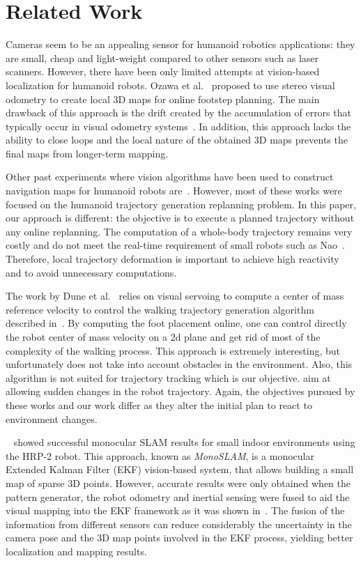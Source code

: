 \section{Related Work}\label{sec:related}

Cameras seem to be an appealing sensor for humanoid robotics
applications: they are small, cheap and light-weight compared to other
sensors such as laser scanners. However, there have been only limited
attempts at vision-based localization for humanoid robots. Ozawa et
al.~\cite{Ozawa05smc} proposed to use stereo visual odometry to create
local 3D maps for online footstep planning. The main drawback of this
approach is the drift created by the accumulation of errors that
typically occur in visual odometry
systems~\cite{Nister04cvpr,Kaess09icra}. In addition, this approach
lacks the ability to close loops and the local nature of the obtained
3D maps prevents the final maps from longer-term mapping.

Other past experiments where vision algorithms have been used to
construct navigation maps for humanoid robots
are~\cite{Michel05humanoids,Michel06icra,Chestnut10book}. However,
most of these works were focused on the humanoid trajectory generation
replanning problem. In this paper, our approach is different: the
objective is to execute a planned trajectory without any online
replanning. The computation of a whole-body trajectory remains very
costly and do not meet the real-time requirement of small robots such
as Nao~\cite{wikipedia.nao}. Therefore, local trajectory deformation
is important to achieve high reactivity and to avoid unnecessary
computations.

The work by Dune et al.~\cite{Dune10iros} relies on visual servoing to
compute a center of mass reference velocity to control the walking
trajectory generation algorithm described in~\cite{Herdt10adr}. By
computing the foot placement online, one can control directly the
robot center of mass velocity on a 2d plane and get rid of most of the
complexity of the walking process. This approach is extremely
interesting, but unfortunately does not take into account obstacles in
the environment. Also, this algorithm is not suited for trajectory
tracking which is our objective. \cite{Harada04humanoids,
  Morisawa07icra} aim at allowing sudden changes in the robot
trajectory. Again, the objectives pursued by these works and our work
differ as they alter the initial plan to react to environment changes.

~\citet{Davison07pami} showed successful monocular SLAM results for
small indoor environments using the HRP-2 robot. This approach, known
as \textit{MonoSLAM}, is a monocular Extended Kalman Filter (EKF)
vision-based system, that allows building a small map of sparse 3D
points. However, accurate results were only obtained when the pattern
generator, the robot odometry and inertial sensing were fused to aid
the visual mapping into the EKF framework as it was shown
in~\cite{Stasse06iros}. The fusion of the information from different
sensors can reduce considerably the uncertainty in the camera pose and
the 3D map points involved in the EKF process, yielding better
localization and mapping results.

